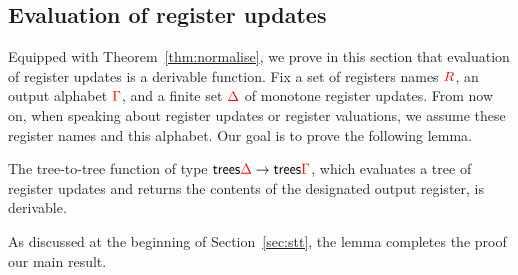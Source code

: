   
\subsection{Evaluation of register updates}
\label{sec:updates-endgame}
Equipped with Theorem~\ref{thm:normalise}, we  prove in this section that evaluation of  register updates is a derivable function. Fix a set of registers names ${{\color{red}{R}}}$, an output alphabet ${\color{red}{\Gamma}}$, and a finite set ${\color{red}{\Delta}}$ of monotone register updates.  From now on, when speaking about register updates or register valuations, we assume these register names and this alphabet. 
Our goal is to prove the following lemma. 
\begin{lemma}\label{lem:derive-register-updates}
    The   tree-to-tree function  of type $\mathsf {trees} {\color{red}{\Delta}} \to \mathsf {trees} {\color{red}{\Gamma}}$, which evaluates a tree of register updates and returns the contents of the designated output register, is derivable. 
\end{lemma}As discussed at the beginning of  Section~\ref{sec:stt}, the lemma completes the proof  our main result. 


